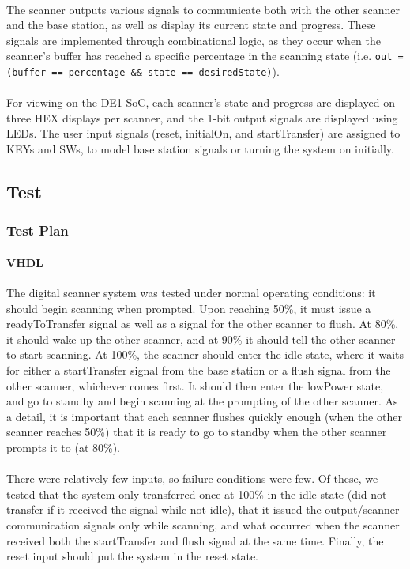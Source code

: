 \documentclass{article}
\begin{document}
  \paragraph{} The scanner outputs various signals to communicate both with the other scanner and the base station, as well as display its current state and progress. These signals are implemented through combinational logic, as they occur when the scanner’s buffer has reached a specific percentage in the scanning state (i.e. \lstinline{out = (buffer == percentage && state == desiredState)}).

  \paragraph{} For viewing on the DE1-SoC, each scanner’s state and progress are displayed on three HEX displays per scanner, and the 1-bit output signals are displayed using LEDs. The user input signals (reset, initialOn, and startTransfer) are assigned to KEYs and SWs, to model base station signals or turning the system on initially.

\subsection{Test}
  \subsubsection{Test Plan}
  \paragraph{VHDL} The digital scanner system was tested under normal operating conditions: it should begin scanning when prompted. Upon reaching 50\%, it must issue a readyToTransfer signal as well as a signal for the other scanner to flush. At 80\%, it should wake up the other scanner, and at 90\% it should tell the other scanner to start scanning. At 100\%, the scanner should enter the idle state, where it waits for either a startTransfer signal from the base station or a flush signal from the other scanner, whichever comes first. It should then enter the lowPower state, and go to standby and begin scanning at the prompting of the other scanner. As a detail, it is important that each scanner flushes quickly enough (when the other scanner reaches 50\%) that it is ready to go to standby when the other scanner prompts it to (at 80\%).

  \paragraph{} There were relatively few inputs, so failure conditions were few. Of these, we tested that the system only transferred once at 100\% in the idle state (did not transfer if it received the signal while not idle), that it issued the output/scanner communication signals only while scanning, and what occurred when the scanner received both the startTransfer and flush signal at the same time. Finally, the reset input should put the system in the reset state.
\end{document}
